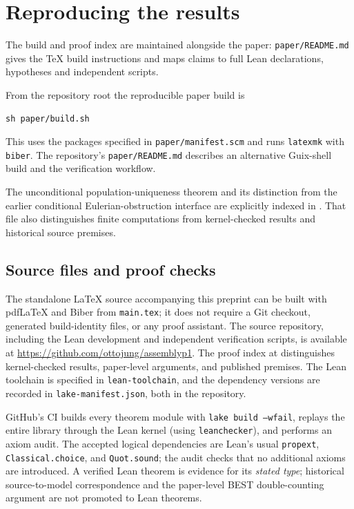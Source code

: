 \section{Reproducing the results}
\label{app:reproduction}

The build and proof index are maintained alongside the paper:
\texttt{paper/README.md} gives the TeX build instructions and
 maps claims to full Lean declarations,
hypotheses and independent scripts.

From the repository root the reproducible paper build is
\begin{verbatim}
sh paper/build.sh
\end{verbatim}
This uses the packages specified in \texttt{paper/manifest.scm} and
runs \texttt{latexmk} with \texttt{biber}. The repository's
\texttt{paper/README.md} describes an alternative Guix-shell build
and the verification workflow.

The unconditional population-uniqueness theorem and its distinction
from the earlier conditional Eulerian-obstruction interface are
explicitly indexed in .
That file also distinguishes finite computations from kernel-checked
results and historical source premises.

\subsection{Source files and proof checks}

The standalone LaTeX source accompanying this preprint can be built
with pdfLaTeX and Biber from \texttt{main.tex}; it does not require
a Git checkout, generated build-identity files, or any proof assistant.
The source repository, including the Lean development and independent
verification scripts, is available at
\url{https://github.com/ottojung/assemblyp1}.
The proof index at  distinguishes
kernel-checked results, paper-level arguments, and published premises.
The Lean toolchain is specified in \texttt{lean-toolchain},
and the dependency versions are recorded in
\texttt{lake-manifest.json}, both in the repository.

GitHub's CI builds every theorem module with
\texttt{lake build --wfail}, replays the entire library through the
Lean kernel (using \texttt{leanchecker}), and performs an axiom audit.
The accepted logical dependencies are Lean's usual
\texttt{propext}, \texttt{Classical.choice}, and \texttt{Quot.sound};
the audit checks that no additional axioms are introduced.
A verified Lean theorem is evidence for its \emph{stated type};
historical source-to-model correspondence and the paper-level
BEST double-counting argument are not promoted to Lean theorems.


